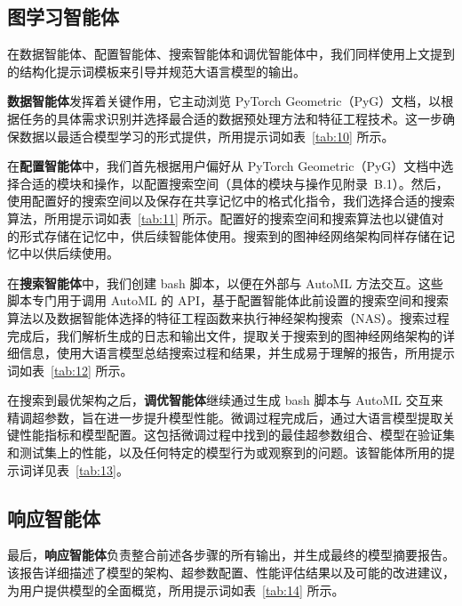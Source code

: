 \documentclass[11pt,UTF8,fontset=fandol]{ctexart}
\begin{document}
\subsection{图学习智能体}

在数据智能体、配置智能体、搜索智能体和调优智能体中，我们同样使用上文提到的结构化提示词模板来引导并规范大语言模型的输出。

\textbf{数据智能体}发挥着关键作用，它主动浏览 PyTorch Geometric（PyG）文档，以根据任务的具体需求识别并选择最合适的数据预处理方法和特征工程技术。这一步确保数据以最适合模型学习的形式提供，所用提示词如表~\ref{tab:10} 所示。

在\textbf{配置智能体}中，我们首先根据用户偏好从 PyTorch Geometric（PyG）文档中选择合适的模块和操作，以配置搜索空间（具体的模块与操作见附录~B.1）。然后，使用配置好的搜索空间以及保存在共享记忆中的格式化指令，我们选择合适的搜索算法，所用提示词如表~\ref{tab:11} 所示。配置好的搜索空间和搜索算法也以键值对的形式存储在记忆中，供后续智能体使用。搜索到的图神经网络架构同样存储在记忆中以供后续使用。

在\textbf{搜索智能体}中，我们创建 bash 脚本，以便在外部与 AutoML 方法交互。这些脚本专门用于调用 AutoML 的 API，基于配置智能体此前设置的搜索空间和搜索算法以及数据智能体选择的特征工程函数来执行神经架构搜索（NAS）。搜索过程完成后，我们解析生成的日志和输出文件，提取关于搜索到的图神经网络架构的详细信息，使用大语言模型总结搜索过程和结果，并生成易于理解的报告，所用提示词如表~\ref{tab:12} 所示。

在搜索到最优架构之后，\textbf{调优智能体}继续通过生成 bash 脚本与 AutoML 交互来精调超参数，旨在进一步提升模型性能。微调过程完成后，通过大语言模型提取关键性能指标和模型配置。这包括微调过程中找到的最佳超参数组合、模型在验证集和测试集上的性能，以及任何特定的模型行为或观察到的问题。该智能体所用的提示词详见表~\ref{tab:13}。

\subsection{响应智能体}

最后，\textbf{响应智能体}负责整合前述各步骤的所有输出，并生成最终的模型摘要报告。该报告详细描述了模型的架构、超参数配置、性能评估结果以及可能的改进建议，为用户提供模型的全面概览，所用提示词如表~\ref{tab:14} 所示。
\end{document}

